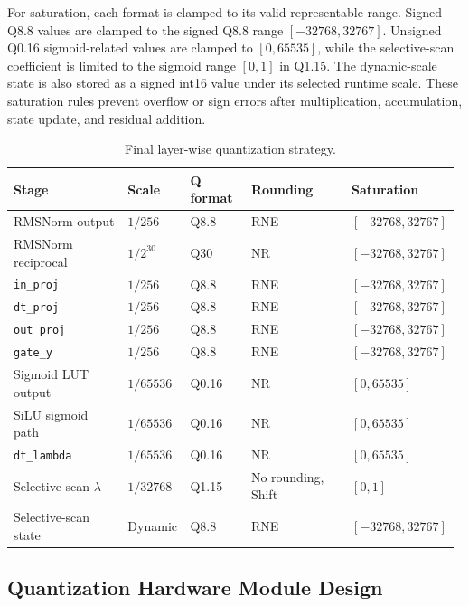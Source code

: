 \documentclass[11pt,twoside]{eitExjobb}
\begin{document}
For saturation, each format is clamped to its valid representable range. Signed Q8.8
values are clamped to the signed Q8.8 range \([-32768,32767]\). Unsigned Q0.16 
sigmoid-related values are clamped to
\([0,65535]\), while the selective-scan coefficient is limited to the sigmoid range
\([0,1]\) in Q1.15. The dynamic-scale state is also stored as a signed int16 value
under its selected runtime scale. These saturation rules prevent overflow or sign
errors after multiplication, accumulation, state update, and residual addition.

\begin{table}[H]
\centering
\caption{Final layer-wise quantization strategy.}
\label{tab:quant_strategy}
\footnotesize
\setlength{\tabcolsep}{1pt}
\renewcommand{\arraystretch}{1.0}
\begin{tabular}{p{0.28\linewidth} p{0.14\linewidth} p{0.14\linewidth} p{0.24\linewidth} p{0.18\linewidth}}
\hline
\textbf{Stage} & \textbf{Scale} & \textbf{Q format} &
\textbf{Rounding} & \textbf{Saturation} \\
\hline
RMSNorm output &
\(1/256\) & Q8.8 &
RNE & \([-32768,32767]\) \\
RMSNorm reciprocal &
\(1/2^{30}\) & Q30 &
NR & \([-32768,32767]\) \\
\texttt{in\_proj} &
\(1/256\) & Q8.8 &
RNE & \([-32768,32767]\) \\
\texttt{dt\_proj} &
\(1/256\) & Q8.8 &
RNE & \([-32768,32767]\) \\
\texttt{out\_proj} &
\(1/256\) & Q8.8 &
RNE & \([-32768,32767]\) \\
\texttt{gate\_y} &
\(1/256\) & Q8.8 &
RNE & \([-32768,32767]\) \\
Sigmoid LUT output &
\(1/65536\) & Q0.16 &
NR & \([0,65535]\) \\
SiLU sigmoid path &
\(1/65536\) & Q0.16 &
NR & \([0,65535]\) \\
\texttt{dt\_lambda} &
\(1/65536\) & Q0.16 &
NR & \([0,65535]\) \\
Selective-scan \(\lambda\) &
\(1/32768\) & Q1.15 &
No rounding, Shift & \([0,1]\) \\
Selective-scan state &
Dynamic & Q8.8 &
RNE & \([-32768,32767]\) \\
\hline
\end{tabular}
\end{table}
\subsection{Quantization Hardware Module Design}
\label{subsec:quant_hw_module}
\end{document}
